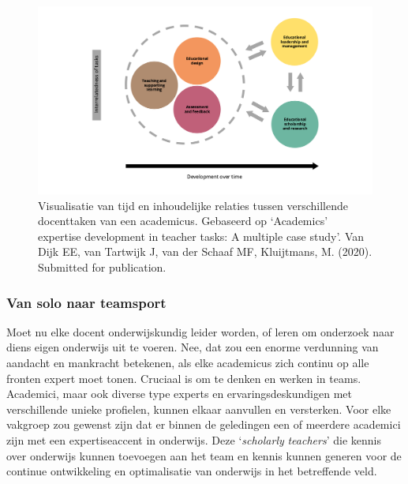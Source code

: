 \documentclass[smallauthor, chapterhaspagenum, nochapterinheader, pagenuminheader,  bigchapnum,medium2, tocpages,  garamond, titleinheader]{jote-book}
\begin{document}
	\begin{figure}
		\includegraphics[width=\linewidth]{media/image9.png}



		\label{fig:rId24}



		\caption{Visualisatie van tijd en inhoudelijke relaties tussen verschillende docenttaken van een academicus. Gebaseerd op ‘Academics' expertise development in teacher tasks: A multiple case study'. Van Dijk EE, van Tartwijk J, van der Schaaf MF, Kluijtmans, M. (2020). Submitted for publication.}
	\end{figure}



	\subsubsection{Van solo naar teamsport}



	Moet nu elke docent onderwijskundig leider worden, of leren om onderzoek naar diens eigen onderwijs uit te voeren. Nee, dat zou een enorme verdunning van aandacht en mankracht betekenen, als elke academicus zich continu op alle fronten expert moet tonen. Cruciaal is om te denken en werken in teams. Academici, maar ook diverse type experts en ervaringsdeskundigen met verschillende unieke profielen, kunnen elkaar aanvullen en versterken. Voor elke vakgroep zou gewenst zijn dat er binnen de geledingen een of meerdere academici zijn met een expertiseaccent in onderwijs. Deze ‘\emph{scholarly}\emph{ }\emph{teachers}' die kennis over onderwijs kunnen toevoegen aan het team en kennis kunnen generen voor de continue ontwikkeling en optimalisatie van onderwijs in het betreffende veld.
\end{document}
